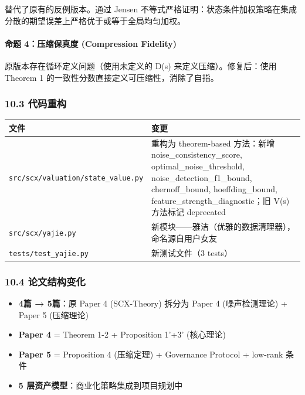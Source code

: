 \documentclass[
  12pt,
]{ctexart}
\providecommand{\tightlist}{%
  \setlength{\itemsep}{0pt}\setlength{\parskip}{0pt}}
\begin{document}
替代了原有的反例版本。通过 Jensen
不等式严格证明：状态条件加权策略在集成分散的期望误差上严格优于或等于全局均匀加权。

\paragraph{命题 4：压缩保真度 (Compression
Fidelity)}\label{ux547dux9898-4ux538bux7f29ux4fddux771fux5ea6-compression-fidelity}

原版本存在循环定义问题（使用未定义的 D(s) 来定义压缩）。修复后：使用
Theorem 1 的一致性分数直接定义可压缩性，消除了自指。

\subsubsection{10.3 代码重构}\label{ux4ee3ux7801ux91cdux6784}

\begin{longtable}[]{@{}
  >{\raggedright\arraybackslash}p{}
  >{\raggedright\arraybackslash}p{}@{}}
\toprule\noalign{}
\begin{minipage}[b]{\linewidth}\raggedright
文件
\end{minipage} & \begin{minipage}[b]{\linewidth}\raggedright
变更
\end{minipage} \\
\midrule\noalign{}
\endhead
\bottomrule\noalign{}
\endlastfoot
\texttt{src/scx/valuation/state\_value.py} & 重构为 theorem-based
方法：新增 noise\_consistency\_score, optimal\_noise\_threshold,
noise\_detection\_f1\_bound, chernoff\_bound, hoeffding\_bound,
feature\_strength\_diagnostic；旧 V(s) 方法标记 deprecated \\
\texttt{src/scx/yajie.py} &
新模块------雅洁（优雅的数据清理器），命名源自用户女友 \\
\texttt{tests/test\_yajie.py} & 新测试文件（3 tests） \\
\end{longtable}

\subsubsection{10.4
论文结构变化}\label{ux8bbaux6587ux7ed3ux6784ux53d8ux5316}

\begin{itemize}
\tightlist
\item
  \textbf{4篇 → 5篇}：原 Paper 4 (SCX-Theory) 拆分为 Paper 4
  (噪声检测理论) + Paper 5 (压缩理论)
\item
  \textbf{Paper 4} = Theorem 1-2 + Proposition 1'+3' (核心理论)
\item
  \textbf{Paper 5} = Proposition 4 (压缩定理) + Governance Protocol +
  low-rank 条件
\item
  \textbf{5 层资产模型}：商业化策略集成到项目规划中
\end{itemize}
\end{document}
